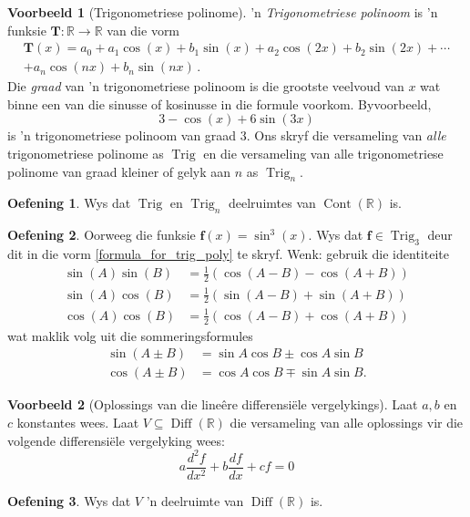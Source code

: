 \documentclass[a4paper,11pt]{book}
\theoremstyle{definition}
\newtheorem{exercise}{Oefening}
\newtheorem{example_environment}{Voorbeeld}[chapter]
\newcommand{\ve}[1]{\mathbf{#1}}
\newenvironment{example}
	{
		\begin{oframed}
		\begin{example_environment}
	}
	{
		\end{example_environment}
		\end{oframed}
	}
\DeclareMathOperator{\Cont}{Cont}
\DeclareMathOperator{\Diff}{Diff}
\DeclareMathOperator{\Trig}{Trig}
\begin{document}
\begin{example}[Trigonometriese polinome] \label{trig_poly_example} 'n
	\emph{Trigonometriese polinoom} is 'n funksie $\ve{T} : \mathbb{R}
	\rightarrow \mathbb{R}$ van die vorm
	\begin{multline} \label{formula_for_trig_poly}
		\ve{T} (x) = a_0 + a_1 \cos(x) + b_1 \sin(x) + a_2 \cos(2x) + b_2
		\sin(2x) + \cdots \\ + a_n \cos(nx) + b_n \sin(nx) \, .
	\end{multline}
	Die \emph{graad} van 'n trigonometriese polinoom is die grootste
	veelvoud van $x$ wat binne een van die sinusse of kosinusse in die
	formule voorkom.  Byvoorbeeld,
	\[
		3 - \cos(x) + 6 \sin(3x)
	\]
	is 'n trigonometriese polinoom van graad 3. Ons skryf die versameling
	van \emph{alle} trigonometriese polinome as $\Trig$ en die versameling
	van alle trigonometriese polinome van graad kleiner of gelyk aan $n$ as
	$\Trig_n$.

	\begin{exercise}
		Wys dat $\Trig$ en $\Trig_n$ deelruimtes van $\Cont (\mathbb{R})$
		is.
	\end{exercise}

	\begin{exercise} Oorweeg die funksie $\ve{f} (x) = \sin^3(x)$. Wys dat
		$\ve{f} \in \Trig_3$ deur dit in die vorm
		\eqref{formula_for_trig_poly} te skryf. Wenk: gebruik die
		identiteite \label{trig_ex_early}
		\begin{align*}
			\sin(A) \sin(B) &= \frac{1}{2}(\cos(A-B) - \cos(A+B)) \\
			\sin(A) \cos(B) &= \frac{1}{2}(\sin(A-B) + \sin(A+B)) \\
			\cos(A)\cos(B) &= \frac{1}{2}(\cos(A-B) + \cos(A+B))
		\end{align*}
		wat maklik volg uit die sommeringsformules
		\begin{align*}
			\sin(A \pm B) &= \sin A \cos B \pm \cos A \sin B \\
			\cos(A \pm B) &= \cos A \cos B \mp \sin A \sin B.
		\end{align*}
	\end{exercise}

\end{example}

\begin{example}[Oplossings van die line{\^e}re differensi{\"e}le
	vergelykings] Laat $a,b$ en $c$ konstantes wees. Laat $V \subseteq
	\Diff(\mathbb{R})$ die versameling van alle oplossings vir die volgende
	differensi{\"e}le vergelyking wees:
	\[
		a \frac{d^2f}{dx^2} + b \frac{df}{dx} + cf = 0
	\]
	\begin{exercise}
		Wys dat $V$ 'n deelruimte van $\Diff(\mathbb{R})$ is.
	\end{exercise}
\end{example}
\end{document}
